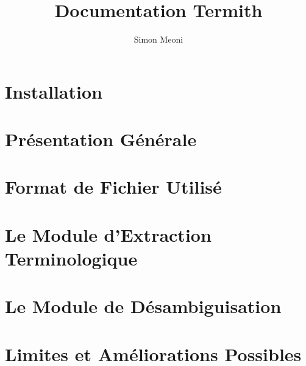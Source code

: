\documentclass[10pt,a4paper]{report}
\title{Documentation Termith}
\author{Simon Meoni}
\begin{document}
\maketitle
\thispagestyle{empty}
\clearpage
\setcounter{page}{1}
\newpage
\tableofcontents
\newpage
\listoffigures
\newpage
\listoftables
\newpage
{}
\chapter{Installation}
\label{chap:installation}


\chapter{Présentation Générale}
\label{chap:presentation}


\chapter{Format de Fichier Utilisé}
\label{chap:format}


\chapter{Le Module d'Extraction Terminologique}
\label{chap:terminologie}


\chapter{Le Module de Désambiguisation}
\label{chap:desamb}


\chapter{Limites et Améliorations Possibles}
\label{chap:limite}

\end{document}
